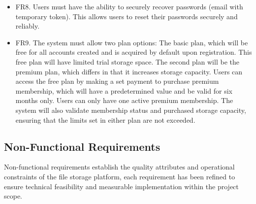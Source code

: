 \begin{itemize}
    \item FR8. Users must have the ability to securely recover passwords (email with temporary token). This allows users to reset their passwords securely and reliably.
    \item FR9. The system must allow two plan options: The basic plan, which will be free for all accounts created and is acquired by default upon registration. This free plan will have limited trial storage space. The second plan will be the premium plan, which differs in that it increases storage capacity. Users can access the free plan by making a set payment to purchase premium membership, which will have a predetermined value and be valid for six months only. Users can only have one active premium membership. The system will also validate membership status and purchased storage capacity, ensuring that the limits set in either plan are not exceeded.
\end{itemize}
\subsection{Non-Functional Requirements}
Non-functional requirements establish the quality attributes and operational constraints of the file storage platform, each requirement has been refined to ensure technical feasibility and measurable implementation within the project scope.

